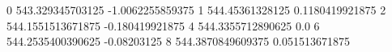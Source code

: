 0 543.329345703125 -1.0062255859375
1 544.45361328125 0.1180419921875
2 544.1551513671875 -0.180419921875
4 544.3355712890625 0.0
6 544.2535400390625 -0.08203125
8 544.3870849609375 0.051513671875
